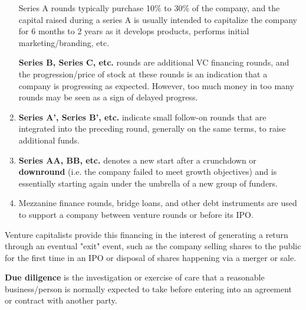 \documentclass{article}
\begin{document}
\begin{definition}
\begin{enumerate}
        Series A rounds typically purchase 10\% to 30\% of the company, and the capital raised during a series A is usually intended to capitalize the company for 6 months to 2 years as it develops products, performs initial marketing/branding, etc. 
        
        \textbf{Series B, Series C, etc.} rounds are additional VC financing rounds, and the progression/price of stock at these rounds is an indication that a company is progressing as expected. However, too much money in too many rounds may be seen as a sign of delayed progress.
        \item \textbf{Series A', Series B', etc.} indicate small follow-on rounds that are integrated into the preceding round, generally on the same terms, to raise additional funds. 
        \item \textbf{Series AA, BB, etc. } denotes a new start after a crunchdown or \textbf{downround} (i.e. the company failed to meet growth objectives) and is essentially starting again under the umbrella of a new group of funders. 
        \item Mezzanine finance rounds, bridge loans, and other debt instruments are used to support a company between venture rounds or before its IPO. 
      \end{enumerate}
      Venture capitalists provide this financing in the interest of generating a return through an eventual "exit" event, such as the company selling shares to the public for the first time in an IPO or disposal of shares happening via a merger or sale. 
    \end{definition}

    \begin{definition}
      \textbf{Due diligence} is the investigation or exercise of care that a reasonable business/person is normally expected to take before entering into an agreement or contract with another party. 
    \end{definition}
\end{document}
